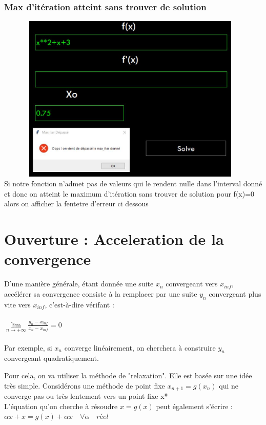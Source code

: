 \documentclass{article}
\begin{document}
\subsubsection{Max d'itération atteint sans trouver de solution}
\includegraphics[width=13cm,height=8cm]{img/validation/err_max.JPG}\\

Si notre fonction n'admet pas de valeurs qui le rendent nulle dans l'interval donné et donc on atteint le maximum d'itération sans trouver de solution pour f(x)=0 alors on afficher la fentetre d'erreur ci dessous


\newpage
\section{Ouverture : Acceleration de la convergence }
D'une manière générale, étant donnée une suite $x_n$ convergeant vers $x_{inf}$, accélérer sa convergence consiste à la remplacer par une suite $y_n$ convergeant plus vite vers $x_{inf}$, c'est-à-dire vérifant : \\ \\
        $\lim\limits_{n \rightarrow +\infty} \frac{ y_n - x_{inf} }{x_n - x_{inf}}=0$ \\
        \\
Par exemple, si $x_n$ converge linéairement, on cherchera à construire $y_n$ convergeant quadratiquement.

Pour cela, on va utiliser la méthode de "relaxation". Elle est basée sur une idée très simple. Considérons une méthode de point fixe $x_{n+1} = g(x_n)$ qui ne converge pas ou très lentement vers un point fixe x*
\\ L'équation qu'on cherche à résoudre $x = g(x)$ peut également s'écrire : \\
$\alpha x + x = g(x) + \alpha x \quad \forall \alpha \quad réel $  \\
\end{document}
